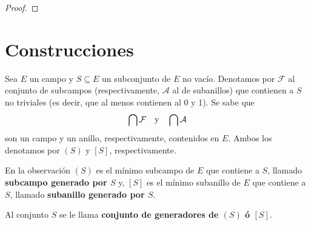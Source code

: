 \documentclass[12pt]{report}
\theoremstyle{largebreak}
\begin{document}
    \begin{proof}
        
    \end{proof}

    \section{Construcciones}

    \begin{obs}
        Sea $E$ un campo y $S\subseteq E$ un subconjunto de $E$ no vacío. Denotamos por $\mathcal{F}$ al conjunto de subcampos (respectivamente, $\mathcal{A}$ al de subanillos) que contienen a $S$ no triviales (es decir, que al menos contienen al 0 y 1). Se sabe que
        \begin{equation*}
            \bigcap\mathcal{F}\quad\textup{y}\quad\bigcap\mathcal{A}
        \end{equation*}
        son un campo y un anillo, respectivamente, contenidos en $E$. Ambos los denotamos por $(S)$ y $[S]$, respectivamente.
    \end{obs}

    \begin{mydef}
        En la observación $(S)$ es el mínimo subcampo de $E$ que contiene a $S$, llamado \textbf{subcampo generado por $S$} y, $[S]$ es el mínimo subanillo de $E$ que contiene a $S$, llamado \textbf{subanillo generado por $S$}.

        Al conjunto $S$ se le llama \textbf{conjunto de generadores de $(S)$ ó $[S]$}.
    \end{mydef}
\end{document}
